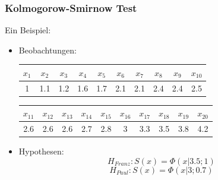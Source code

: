 \documentclass{beamer}
\begin{document}
\begin{frame}
\frametitle{Kolmogorow-Smirnow Test}
Ein Beispiel:\\
	\begin{itemize}
		\item Beobachtungen:
			\begin{table}[h]
			\center
			\begin{tabular}{c|c|c|c|c|c|c|c|c|c}
			$x_1$	&$x_2$	&$x_3$	&$x_4$	&$x_5$	&$x_6$	&$x_7$	&$x_8$	&$x_9$	&$x_{10}$\\
			\hline
			1	&1.1	&1.2	&1.6	&1.7	&2.1	&2.1	&2.4	&2.4	&2.5	\\
			\end{tabular}
			\begin{tabular}{c|c|c|c|c|c|c|c|c|c}
			$x_{11}$	&$x_{12}$	&$x_{13}$	&$x_{14}$	&$x_{15}$	&$x_{16}$	&$x_{17}$	&$x_{18}$	&$x_{19}$	&$x_{20}$\\
			\hline
			2.6	&2.6	&2.6	&2.7	&2.8	&3	&3.3	&3.5	&3.8	&4.2\\
			\end{tabular}
			\end{table}
		\item Hypothesen: $$H_{Franz}:S(x)=\Phi(x|3.5;1)$$ $$H_{Paul}:S(x)=\Phi(x|3;0.7)$$
	\end{itemize}
\end{frame}
\end{document}
